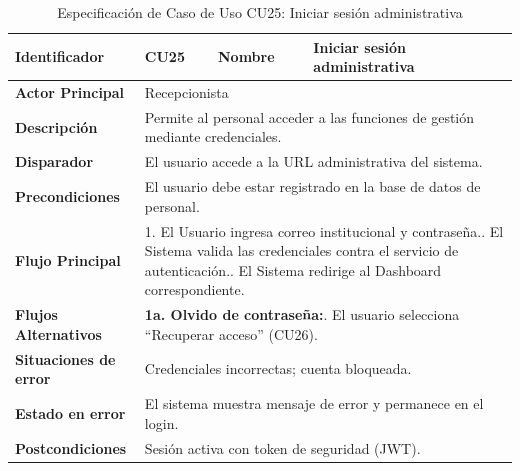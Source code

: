\vspace{0.5cm}
\begingroup
\setlength{\parskip}{0pt}
\begin{longtable}{|p{3.5cm}|p{2cm}|p{2.5cm}|p{7cm}|}
\caption{Especificación de Caso de Uso CU25: Iniciar sesión administrativa}
\label{tab:cu25_login} \\
\hline
\textbf{Identificador} & CU25 & \textbf{Nombre} & Iniciar sesión administrativa \\ \hline
\textbf{Actor Principal} & \multicolumn{3}{p{11.5cm}|}{Recepcionista} \\ \hline
\textbf{Descripción} & \multicolumn{3}{p{11.5cm}|}{Permite al personal acceder a las funciones de gestión mediante credenciales.} \\ \hline
\textbf{Disparador} & \multicolumn{3}{p{11.5cm}|}{El usuario accede a la URL administrativa del sistema.} \\ \hline
\textbf{Precondiciones} & \multicolumn{3}{p{11.5cm}|}{El usuario debe estar registrado en la base de datos de personal.} \\ \hline
\textbf{Flujo Principal} & \multicolumn{3}{p{11.5cm}|}{1. El Usuario ingresa correo institucional y contraseña.\newline 2. El Sistema valida las credenciales contra el servicio de autenticación.\newline 3. El Sistema redirige al Dashboard correspondiente.} \\ \hline
\textbf{Flujos Alternativos} & \multicolumn{3}{p{11.5cm}|}{\textbf{1a. Olvido de contraseña:}\newline 1. El usuario selecciona ``Recuperar acceso'' (CU26).} \\ \hline
\textbf{Situaciones de error} & \multicolumn{3}{p{11.5cm}|}{Credenciales incorrectas; cuenta bloqueada.} \\ \hline
\textbf{Estado en error} & \multicolumn{3}{p{11.5cm}|}{El sistema muestra mensaje de error y permanece en el login.} \\ \hline
\textbf{Postcondiciones} & \multicolumn{3}{p{11.5cm}|}{Sesión activa con token de seguridad (JWT).} \\ \hline
\end{longtable}
\endgroup

\vspace{0.6cm}

